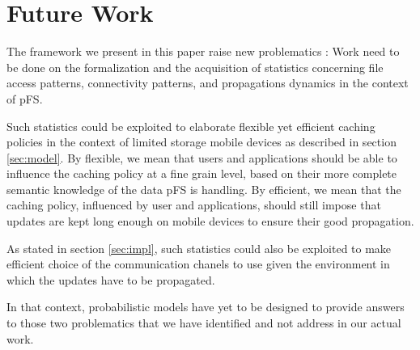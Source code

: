 
\section{Future Work}
\label{sec:futwk}

The framework we present in this paper raise new problematics : Work
need to be done on the formalization and the acquisition of statistics
concerning file access patterns, connectivity patterns, and
propagations dynamics in the context of pFS. 

Such statistics could be exploited to elaborate flexible yet efficient
caching policies in the context of limited storage mobile devices as
described in section \ref{sec:model}. By flexible, we mean that users
and applications should be able to influence the caching policy at a
fine grain level, based on their more complete semantic knowledge of
the data pFS is handling. By efficient, we mean that the caching
policy, influenced by user and applications, should still impose that
updates are kept long enough on mobile devices to ensure their good
propagation.

As stated in section \ref{sec:impl}, such statistics could also be
exploited to make efficient choice of the communication chanels to use
given the environment in which the updates have to be propagated.

In that context, probabilistic models have yet to be designed to
provide answers to those two problematics that we have identified and
not address in our actual work.


